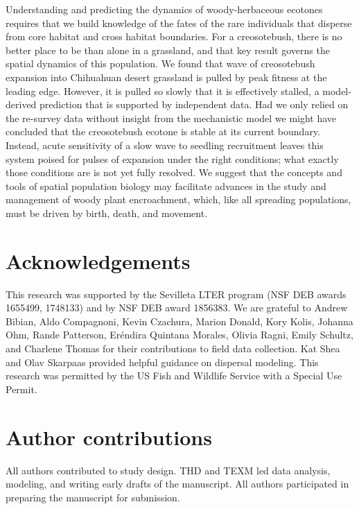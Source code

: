 \documentclass[11pt]{article}\usepackage[]{graphicx}\usepackage[usenames,dvipsnames]{xcolor}
\begin{document}
Understanding and predicting the dynamics of woody-herbaceous ecotones requires that we build knowledge of the fates of the rare individuals that disperse from core habitat and cross habitat boundaries. 
For a creosotebush, there is no better place to be than alone in a grassland, and that key result governs the spatial dynamics of this population. 
We found that wave of creosotebush expansion into Chihuahuan desert grassland is pulled by peak fitness at the leading edge.
However, it is pulled so slowly that it is effectively stalled, a model-derived prediction that is supported by independent data. 
Had we only relied on the re-survey data without insight from the mechanistic model we might have concluded that the creosotebush ecotone is stable at its current boundary.
Instead, acute sensitivity of a slow wave to seedling recruitment leaves this system poised for pulses of expansion under the right conditions; what exactly those conditions are is not yet fully resolved.
We suggest that the concepts and tools of spatial population biology may facilitate advances in the study and management of woody plant encroachment, which, like all spreading populations, must be driven by birth, death, and movement. 


\section*{Acknowledgements}
This research was supported by the Sevilleta LTER program (NSF DEB awards 1655499, 1748133) and by NSF DEB award 1856383.
We are grateful to Andrew Bibian, Aldo Compagnoni, Kevin Czachura, Marion Donald, Kory Kolis, Johanna Ohm, Rande Patterson, Er\'{e}ndira Quintana Morales, Olivia Ragni, Emily Schultz, and Charlene Thomas for their contributions to field data collection.
Kat Shea and Olav Skarpaas provided helpful guidance on dispersal modeling.
This research was permitted by the US Fish and Wildlife Service with a Special Use Permit.

\section*{Author contributions}
All authors contributed to study design. 
THD and TEXM led data analysis, modeling, and writing early drafts of the manuscript. 
All authors participated in preparing the manuscript for submission.



\end{document}
